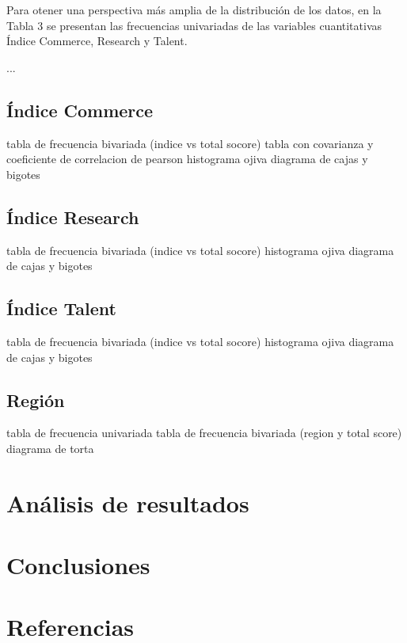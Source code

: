 \documentclass[
]{article}
\begin{document}
\begin{multicols}{2}

Para otener una perspectiva más amplia de la distribución de los datos, en la Tabla 3 se presentan las frecuencias univariadas de las variables cuantitativas Índice Commerce, Research y Talent. 

...

\subsection{Índice Commerce}
tabla de frecuencia bivariada (indice vs total socore)
tabla con covarianza y coeficiente de correlacion de pearson
histograma
ojiva
diagrama de cajas y bigotes

\subsection{Índice Research}
tabla de frecuencia bivariada (indice vs total socore)
histograma
ojiva
diagrama de cajas y bigotes

\subsection{Índice Talent}
tabla de frecuencia bivariada (indice vs total socore)
histograma
ojiva
diagrama de cajas y bigotes

\subsection{Región}
tabla de frecuencia univariada
tabla de frecuencia bivariada (region y total score)
diagrama de torta

\section{Análisis de resultados}

\section{Conclusiones}
\section{Referencias}

\end{multicols}
\end{document}

